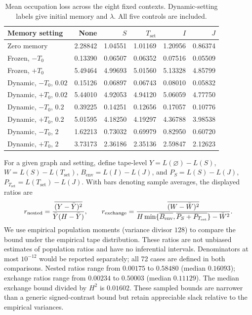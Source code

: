\documentclass[preprint,11pt,sort&compress]{elsarticle}
\begin{document}
\begin{table}[ht]
\centering\small
\caption{Mean occupation loss across the eight fixed contexts. Dynamic-setting labels give initial memory and $\lambda$. All five controls are included.}\label{tab:memory_modes}
\begin{tabular}{lrrrrr}\toprule
Memory setting & None & $S$ & $T_{\mathrm{set}}$ & $I$ & $J$\\\midrule
Zero memory & 2.28842 & 1.04551 & 1.01169 & 1.20956 & 0.86374\\
Frozen, $-T_0$ & 0.13390 & 0.06507 & 0.06352 & 0.07516 & 0.05509\\
Frozen, $+T_0$ & 5.49464 & 4.99693 & 5.01560 & 5.13328 & 4.85799\\
Dynamic, $-T_0$, $0.02$ & 0.15126 & 0.06897 & 0.06743 & 0.08010 & 0.05832\\
Dynamic, $+T_0$, $0.02$ & 5.44010 & 4.92053 & 4.94120 & 5.06059 & 4.77750\\
Dynamic, $-T_0$, $0.2$ & 0.39225 & 0.14251 & 0.12656 & 0.17057 & 0.10776\\
Dynamic, $+T_0$, $0.2$ & 5.01595 & 4.18250 & 4.19297 & 4.36788 & 3.98538\\
Dynamic, $-T_0$, $2$ & 1.62213 & 0.73032 & 0.69979 & 0.82950 & 0.60720\\
Dynamic, $+T_0$, $2$ & 3.73173 & 2.36186 & 2.35136 & 2.59847 & 2.12623\\
\bottomrule\end{tabular}\end{table}

For a given graph and setting, define tape-level $Y=L(\varnothing)-L(S)$, $W=L(S)-L(T_{\mathrm{set}})$, $B_{\mathrm{env}}=L(I)-L(J)$, and $P_S=L(S)-L(J)$, $P_{T_{\mathrm{set}}}=L(T_{\mathrm{set}})-L(J)$. With bars denoting sample averages, the displayed ratios are
\[
 r_{\rm nested}=\frac{\overline{(Y-\bar Y)^2}}{\bar Y(H-\bar Y)},\qquad
 r_{\rm exchange}=\frac{\overline{(W-\bar W)^2}}{H\min\{\overline{B_{\mathrm{env}}},\overline{P_S+P_{T_{\mathrm{set}}}}\}-\bar W^2}.
\]
We use empirical population moments (variance divisor $128$) to compare the bound under the empirical tape distribution. These ratios are not unbiased estimates of population ratios and have no inferential intervals. Denominators at most $10^{-12}$ would be reported separately; all 72 cases are defined in both comparisons. Nested ratios range from $0.00175$ to $0.58480$ (median $0.16093$); exchange ratios range from $0.00234$ to $0.50003$ (median $0.11129$). The median exchange bound divided by $H^2$ is $0.01602$. These sampled bounds are narrower than a generic signed-contrast bound but retain appreciable slack relative to the empirical variances.
\end{document}
